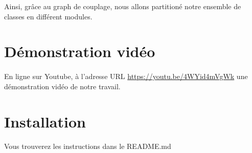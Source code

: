 \documentclass[a4paper]{article}
\begin{document}
                Ainsi, grâce au graph de couplage, nous allons partitioné notre ensemble de classes en différent modules.
        \section*{Démonstration vidéo}
            \paragraph{}
                En ligne sur Youtube, à l'adresse URL 
                \url{https://youtu.be/4WYid4mVgWk} 
                une démonstration vidéo de notre travail.
        \section*{Installation}
            \paragraph{}
                Vous trouverez les instructions dans le README.md
\end{document}
